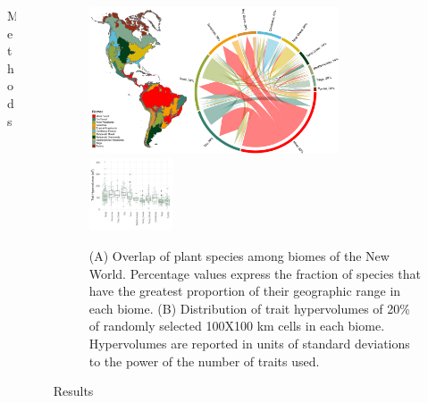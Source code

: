 \documentclass[final]{beamer}
\newlength{\sepwid}
\newlength{\onecolwid}
\newlength{\twocolwid}
\begin{document}
\begin{frame}[t]
\begin{columns}[t]
\begin{column}{\onecolwid}
\begin{alertblock}{Methods}
	\end{alertblock}

    \end{column}


    \begin{column}{\sepwid}\end{column}			%
    \begin{column}{\twocolwid}							%

\begin{figure}[h]
	\centering
	\includegraphics[width=0.75\textwidth]{./figures/Figure1.pdf}
	~
	\includegraphics[width=0.25\textwidth]{./figures/Hypervolume_sp_sample_gaussian20perc.pdf}
	\caption{(A) Overlap of plant species among biomes of the New World. Percentage values express the fraction of species that have the greatest proportion of their geographic range in each biome. (B) Distribution of trait hypervolumes of 20\% of randomly selected 100X100 km cells in each biome. Hypervolumes are reported in units of standard deviations to the power of the number of traits used.}
	\label{fig:map}
\end{figure}



\begin{alertblock}{Results}


		 
\begin{multicols}{2}


\end{multicols}
\end{alertblock}
\end{column}
\end{columns}
\end{frame}
\end{document}
